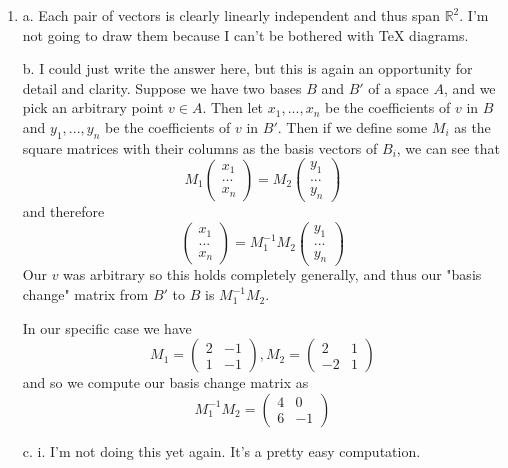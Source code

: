 \documentclass{article}
\newcommand{\chapternumber}{2}
\newenvironment{QandA}{\begin{enumerate}[label=\chapternumber.\arabic*]\bfseries\boldmath}
	{\end{enumerate}}
\newenvironment{answered}{\par\bigskip\normalfont\unboldmath}{}
\begin{document}
\begin{QandA}
		\item 
		\begin{answered}
			a. Each pair of vectors is clearly linearly independent and thus span $\mathbb{R}^2$. I'm not going to draw them because I can't be bothered with TeX diagrams.
			
			b. I could just write the answer here, but this is again an opportunity for detail and clarity. Suppose we have two bases $B$ and $B'$ of a space $A$, and we pick an arbitrary point $v\in A$. Then let $x_1,...,x_n$ be the coefficients of $v$ in $B$ and $y_1,...,y_n$ be the coefficients of $v$ in $B'$. Then if we define some $M_i$ as the square matrices with their columns as the basis vectors of $B_i$, we can see that
			\[
			M_1
			\begin{pmatrix}
				x_1 \\ ... \\ x_n
			\end{pmatrix}
			=
			M_2
			\begin{pmatrix}
				y_1 \\ ... \\ y_n
			\end{pmatrix}
			\]
			and therefore
			\[
			\begin{pmatrix}
				x_1 \\ ... \\ x_n
			\end{pmatrix}
			=
			M_1^{-1}
			M_2
			\begin{pmatrix}
				y_1 \\ ... \\ y_n
			\end{pmatrix}
			\]
			Our $v$ was arbitrary so this holds completely generally, and thus our "basis change" matrix from $B'$ to $B$ is $M_1^{-1}M_2$.
			
			In our specific case we have
			\[M_1 = 
			\begin{pmatrix}
				2 & -1 \\
				1 & -1
			\end{pmatrix},
			M_2 = 
			\begin{pmatrix}
				2 & 1 \\
				-2 & 1
			\end{pmatrix}
			\]
			and so we compute our basis change matrix as 
			\[M_1^{-1}M_2=
			\begin{pmatrix}
				4 & 0 \\
				6 & -1
			\end{pmatrix}
			\]
			
			c. i. I'm not doing this yet again. It's a pretty easy computation.
			

\end{answered}
\end{QandA}
\end{document}

